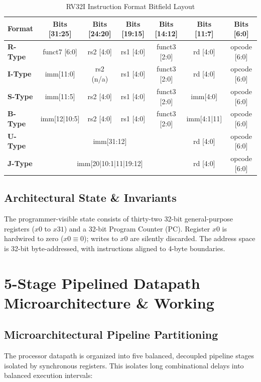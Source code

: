 \documentclass[10.5pt,a4paper]{article}
\begin{document}
\begin{table}[htbp]
\centering
\caption{RV32I Instruction Format Bitfield Layout}
\label{tab:formats}
\scriptsize
\begin{tabular}{lcccccc}
\toprule
\textbf{Format} & \textbf{Bits [31:25]} & \textbf{Bits [24:20]} & \textbf{Bits [19:15]} & \textbf{Bits [14:12]} & \textbf{Bits [11:7]} & \textbf{Bits [6:0]} \\
\midrule
\textbf{R-Type} & funct7 [6:0] & rs2 [4:0] & rs1 [4:0] & funct3 [2:0] & rd [4:0] & opcode [6:0] \\
\textbf{I-Type} & imm[11:0]    & rs2 (n/a) & rs1 [4:0] & funct3 [2:0] & rd [4:0] & opcode [6:0] \\
\textbf{S-Type} & imm[11:5]    & rs2 [4:0] & rs1 [4:0] & funct3 [2:0] & imm[4:0] & opcode [6:0] \\
\textbf{B-Type} & imm[12|10:5] & rs2 [4:0] & rs1 [4:0] & funct3 [2:0] & imm[4:1|11] & opcode [6:0] \\
\textbf{U-Type} & \multicolumn{4}{c}{imm[31:12]} & rd [4:0] & opcode [6:0] \\
\textbf{J-Type} & \multicolumn{4}{c}{imm[20|10:1|11|19:12]} & rd [4:0] & opcode [6:0] \\
\bottomrule
\end{tabular}
\end{table}

\subsection{Architectural State \& Invariants}
The programmer-visible state consists of thirty-two 32-bit general-purpose registers ($x0$ to $x31$) and a 32-bit Program Counter (PC). Register $x0$ is hardwired to zero ($x0 \equiv 0$); writes to $x0$ are silently discarded. The address space is 32-bit byte-addressed, with instructions aligned to 4-byte boundaries.

\vspace{0.4cm}


\section{5-Stage Pipelined Datapath Microarchitecture \& Working}

\subsection{Microarchitectural Pipeline Partitioning}
The processor datapath is organized into five balanced, decoupled pipeline stages isolated by synchronous registers. This isolates long combinational delays into balanced execution intervals:
\end{document}
